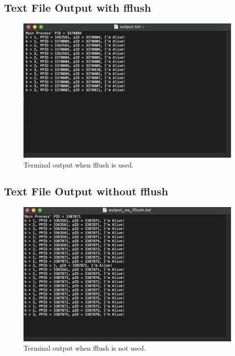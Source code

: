 \documentclass[12pt]{article}
\begin{document}
\subsection{Text File Output with fflush}
\begin{figure}[h]
\centering
\includegraphics[width=\textwidth]{output_with_fflush.png}
\caption{Terminal output when fflush is used.}
\end{figure}

\newpage
  \subsection{Text File Output without fflush}
  \begin{figure}[h]
    \centering
    \includegraphics[width=17cm]{output_no_fflush.png}
    \caption{Terminal output when fflush is not used.}
  \end{figure}
\end{document}

